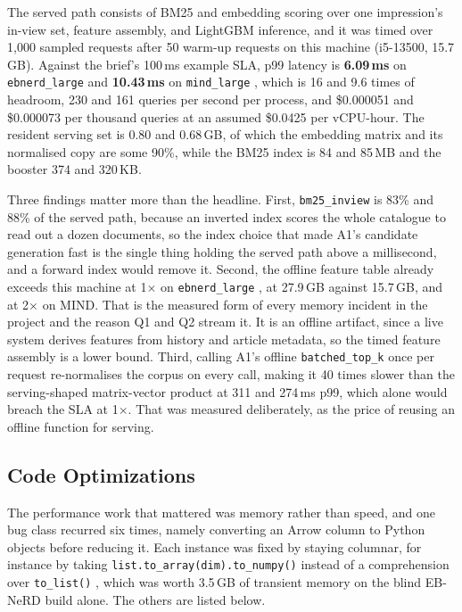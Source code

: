 \documentclass[11pt]{article}
\newcommand{\code}[1]{%
    \colorbox{gray!40}{\texttt{#1}}%
}
\begin{document}
The served path consists of BM25 and embedding scoring over one impression's
in-view set, feature assembly, and LightGBM inference, and it was timed over
1,000 sampled requests after 50 warm-up requests on this machine (i5-13500,
15.7\,GB). Against the brief's 100\,ms example SLA, p99 latency is
\textbf{6.09\,ms} on \code{ebnerd\_large} and \textbf{10.43\,ms} on
\code{mind\_large}, which is 16 and 9.6 times of headroom, 230 and 161 queries
per second per process, and \$0.000051 and \$0.000073 per thousand queries at
an assumed \$0.0425 per vCPU-hour. The resident serving set is 0.80 and
0.68\,GB, of which the embedding matrix and its normalised copy are some 90\%,
while the BM25 index is 84 and 85\,MB and the booster 374 and 320\,KB.

Three findings matter more than the headline. First, \code{bm25\_inview} is
83\% and 88\% of the served path, because an inverted index scores the whole
catalogue to read out a dozen documents, so the index choice that made A1's
candidate generation fast is the single thing holding the served path above a
millisecond, and a forward index would remove it. Second, the offline feature
table already exceeds this machine at 1$\times$ on \code{ebnerd\_large}, at
27.9\,GB against 15.7\,GB, and at 2$\times$ on MIND. That is the measured form
of every memory incident in the project and the reason Q1 and Q2 stream it. It
is an offline artifact, since a live system derives features from history and
article metadata, so the timed feature assembly is a lower bound. Third,
calling A1's offline \code{batched\_top\_k} once per request re-normalises the
corpus on every call, making it 40 times slower than the serving-shaped
matrix-vector product at 311 and 274\,ms p99, which alone would breach the SLA
at 1$\times$. That was measured deliberately, as the price of reusing an
offline function for serving.

\subsection{Code Optimizations}
\label{sec:optimizations}

The performance work that mattered was memory rather than speed, and one bug
class recurred six times, namely converting an Arrow column to Python objects
before reducing it. Each instance was fixed by staying columnar, for instance
by taking \code{list.to\_array(dim).to\_numpy()} instead of a comprehension
over \code{to\_list()}, which was worth 3.5\,GB of transient memory on the
blind EB-NeRD build alone. The others are listed below.
\end{document}
